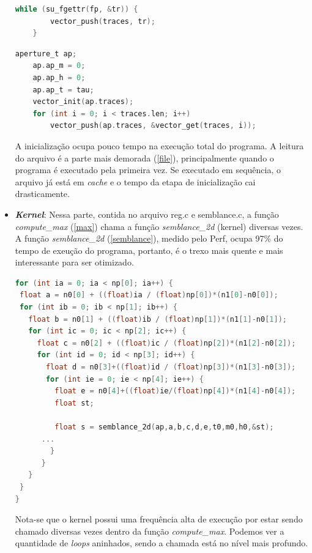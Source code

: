 \documentclass[12pt]{article}
\begin{document}
\begin{itemize}
\begin{lstlisting}[language=c, caption=Leitura do arquivo com os dados sismícos., label=file]
    while (su_fgettr(fp, &tr)) {
        vector_push(traces, tr);
    }
\end{lstlisting}

\begin{lstlisting}[language=c, caption=Preenchimento da estrtura de dados., label=struct]
   aperture_t ap;
    ap.ap_m = 0;
    ap.ap_h = 0;
    ap.ap_t = tau;
    vector_init(ap.traces);
    for (int i = 0; i < traces.len; i++)
        vector_push(ap.traces, &vector_get(traces, i));
\end{lstlisting}


A inicialização ocupa pouco tempo na execução total do programa. A leitura do arquivo é a parte mais demorada (\ref{file}), principalmente quando o programa é executado pela primeira vez. Se executado em sequência, o arquivo já está em \textit{cache} e o tempo da etapa de inicialização cai drasticamente.
\\
\item \textit{\textbf{Kernel}}: Nessa parte, contida no arquivo reg.c e semblance.c, a função \textit{compute\_max} (\ref{max}) chama a função \textit{semblance\_2d} (kernel) diversas vezes. A função \textit{semblance\_2d} (\ref{semblance}), medido pelo Perf, ocupa 97\% do tempo de exeução do programa, portanto, é o trexo mais quente e mais interessante para ser otimizado. 

\begin{lstlisting}[language=c, caption=Corpo da função \textit{compute\_max}., label=max]
for (int ia = 0; ia < np[0]; ia++) {
 float a = n0[0] + ((float)ia / (float)np[0])*(n1[0]-n0[0]);
 for (int ib = 0; ib < np[1]; ib++) {
   float b = n0[1] + ((float)ib / (float)np[1])*(n1[1]-n0[1]);
   for (int ic = 0; ic < np[2]; ic++) {
     float c = n0[2] + ((float)ic / (float)np[2])*(n1[2]-n0[2]);
     for (int id = 0; id < np[3]; id++) {
       float d = n0[3]+((float)id / (float)np[3])*(n1[3]-n0[3]);
       for (int ie = 0; ie < np[4]; ie++) {
         float e = n0[4]+((float)ie/(float)np[4])*(n1[4]-n0[4]);
         float st;
                       
         float s = semblance_2d(ap,a,b,c,d,e,t0,m0,h0,&st);
	  ...
        }
      }
   }
 }
}
\end{lstlisting}

Nota-se que o kernel possui uma frequência alta de execução por estar sendo chamado diversas vezes dentro da função \textit{compute\_max}. Podemos ver a quantidade de \textit{loops} aninhados, sendo a chamada está no nível mais profundo.


\end{itemize}
\end{document}
